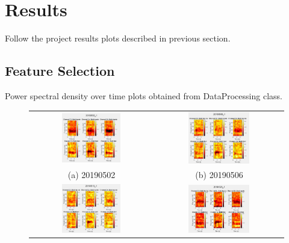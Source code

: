
\section{Results}\label{sec:target_of_the_project} 
Follow the project results plots described in previous section. 
\subsection{Feature Selection}\label{subsec:status}
Power spectral density over time plots obtained from DataProcessing class.
\begin{figure}
\begin{tabular}{cc}

    \includegraphics[width=0.5\textwidth]{Figure/20190502_ERDERS.JPG} &   \includegraphics[width=0.5\textwidth]{Figure/20190506_ERDERS.JPG} \\
    (a) 20190502 & (b) 20190506 \\
    \includegraphics[width=0.5\textwidth]{Figure/20190513_ERDERS.JPG} &   \includegraphics[width=0.5\textwidth]{Figure/20190521_ERDERS.JPG} \\

\end{tabular}
\end{figure}
